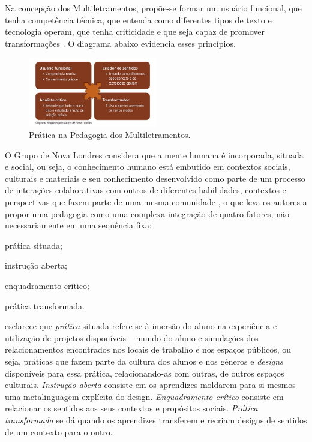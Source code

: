 \documentclass{textolivre}
\begin{document}
Na concepção dos Multiletramentos, propõe-se formar um usuário funcional, que
tenha competência técnica, que entenda como diferentes tipos de texto e
tecnologia operam, que tenha criticidade e que seja capaz de promover
transformações \cite{rojo2012}. O diagrama abaixo evidencia esses princípios.

\begin{figure}[htbp]
 \centering
 \includegraphics[width=0.5\textwidth]{figure01.png}
 \caption{Prática na Pedagogia dos Multiletramentos.}
 \label{fig01}
\end{figure}

O Grupo de Nova Londres considera que a mente humana é incorporada, situada e
social, ou seja, o conhecimento humano está embutido em contextos sociais,
culturais e materiais e seu conhecimento desenvolvido como parte de um processo
de interações colaborativas com outros de diferentes habilidades, contextos e
perspectivas que fazem parte de uma mesma comunidade \cite{cope2009}, o
que leva os autores a propor uma pedagogia como uma complexa integração de
quatro fatores, não necessariamente em uma sequência fixa: 
\begin{enumerate*}[label=\alph*)]
\item prática situada;
\item instrução aberta;
\item enquadramento crítico;
\item prática transformada. 
\end{enumerate*}

\textcite{rojo2012} esclarece que \emph{prática} situada refere-se à imersão do aluno
na experiência e utilização de projetos disponíveis – mundo do aluno e
simulações dos relacionamentos encontrados nos locais de trabalho e nos espaços
públicos, ou seja, práticas que fazem parte da cultura dos alunos e nos gêneros
e \emph{designs} disponíveis para essa prática, relacionando-as com outras, de outros
espaços culturais. \emph{Instrução aberta} consiste em os aprendizes moldarem para si
mesmos uma metalinguagem explícita do design. \emph{Enquadramento crítico} consiste em
relacionar os sentidos aos seus contextos e propósitos sociais. \emph{Prática
transformada} se dá quando os aprendizes transferem e recriam designs de
sentidos de um contexto para o outro.
\end{document}
